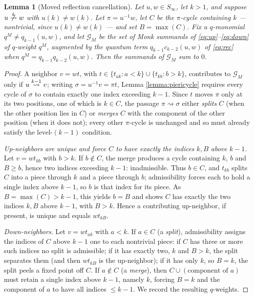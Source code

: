\documentclass{amsart}
\newtheorem{lemma}{Lemma}[section]
\theoremstyle{definition}
\theoremstyle{remark}
\numberwithin{equation}{section}
\newcommand{\xrightsquigarrow}[2][]{%
	\mathrel{\mathop{\rightsquigarrow}\limits^{\scriptstyle #2}%
	\ifx\hfuzz#1\hfuzz\else_{\scriptstyle #1}\fi}%
}
\newcommand{\tom}[1]{\ensuremath{\xrightsquigarrow{#1}}}
\begin{document}
\begin{lemma}[Moved reflection cancellation] \label{lemma:movedcancel}
Let $u,w\in S_\infty$, let $k>1$, and suppose $u\ntom{k}w$ with $u(k)\neq w(k)$. Let $\pi=u^{-1}w$, let $C$ be the $\pi$-cycle containing $k$ --- nontrivial, since $u(k)\neq w(k)$ --- and set $B=\max(C)$. Fix a $q$-monomial $q^M\neq q_{k-1}(u,w)$, and let $\mathcal{G}_M$ be the set of Monk summands of \eqref{eq:up}--\eqref{eq:down} of $q$-weight $q^M$, augmented by the quantum term $q_{k-1}c_{k-2}(u,w)$ of \eqref{eq:rec} when $q^M=q_{k-1}q_{k-2}(u,w)$. Then the summands of $\mathcal{G}_M$ sum to $0$.
\end{lemma}
\begin{proof}
A neighbor $v=wt$, with $t\in\{t_{ak}:a<k\}\cup\{t_{kb}:b>k\}$, contributes to $\mathcal{G}_M$ only if $u\tom{k-1}v$; writing $\sigma=u^{-1}v=\pi t$, Lemma \ref{lemma:piericycle} requires every cycle of $\sigma$ to contain exactly one index exceeding $k-1$. Since $t$ moves $\pi$ only at its two positions, one of which is $k\in C$, the passage $\pi\rightsquigarrow\sigma$ either \emph{splits} $C$ (when the other position lies in $C$) or \emph{merges} $C$ with the component of the other position (when it does not); every other $\pi$-cycle is unchanged and so must already satisfy the level-$(k-1)$ condition.

\emph{Up-neighbors are unique and force $C$ to have exactly the indices $k,B$ above $k-1$.} Let $v=wt_{kb}$ with $b>k$. If $b\notin C$, the merge produces a cycle containing $k$, $b$ and $B\geq b$, hence two indices exceeding $k-1$: inadmissible. Thus $b\in C$, and $t_{kb}$ splits $C$ into a piece through $k$ and a piece through $b$; admissibility forces each to hold a single index above $k-1$, so $b$ is that index for its piece. As $B=\max(C)>k-1$, this yields $b=B$ and shows $C$ has exactly the two indices $k,B$ above $k-1$, with $B>k$. Hence a contributing up-neighbor, if present, is unique and equals $wt_{kB}$.

\emph{Down-neighbors.} Let $v=wt_{ak}$ with $a<k$. If $a\in C$ (a \emph{split}), admissibility assigns the indices of $C$ above $k-1$ one to each nontrivial piece: if $C$ has three or more such indices no split is admissible; if it has exactly two, $k$ and $B>k$, the split separates them (and then $wt_{kB}$ is the up-neighbor); if it has only $k$, so $B=k$, the split peels a fixed point off $C$. If $a\notin C$ (a \emph{merge}), then $C\cup(\text{component of }a)$ must retain a single index above $k-1$, namely $k$, forcing $B=k$ and the component of $a$ to have all indices $\leq k-1$. We record the resulting $q$-weights.


\end{proof}
\end{document}
